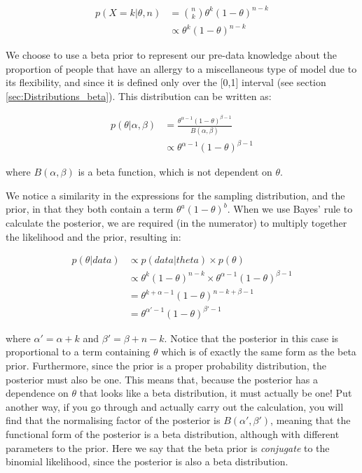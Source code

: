 \documentclass[11pt,fullpage]{book}
\begin{document}
\begin{align}
p(X=k|\theta,n) &= {n \choose k} \theta^k (1-\theta)^{n-k}\\
&\propto \theta^k (1-\theta)^{n-k}
\end{align}

We choose to use a beta prior to represent our pre-data knowledge about the proportion of people that have an allergy to a miscellaneous type of model due to its flexibility, and since it is defined only over the [0,1] interval (see section \ref{sec:Distributions_beta}). This distribution can be written as:

\begin{align}
p(\theta|\alpha,\beta) &= \frac{\theta^{\alpha-1}(1-\theta)^{\beta-1}}{B(\alpha,\beta)}\\
&\propto \theta^{\alpha-1}(1-\theta)^{\beta-1}
\end{align}

where $B(\alpha,\beta)$ is a beta function, which is not dependent on $\theta$.

We notice a similarity in the expressions for the sampling distribution, and the prior, in that they both contain a term $\theta^a (1-\theta)^b$. When we use Bayes' rule to calculate the posterior, we are required (in the numerator) to multiply together the likelihood and the prior, resulting in:

\begin{align}
p(\theta|data) &\propto p(data|theta) \times p(\theta)\\
&\propto \theta^k (1-\theta)^{n-k} \times \theta^{\alpha-1}(1-\theta)^{\beta-1}\\
&= \theta^{k+ \alpha - 1} (1-\theta)^{n-k + \beta - 1}\\
&= \theta^{\alpha' - 1}(1-\theta)^{\beta'-1}
\end{align}

where $\alpha'=\alpha + k$ and $\beta'= \beta + n - k$. Notice that the posterior in this case is proportional to a term containing $\theta$ which is of exactly the same form as the beta prior. Furthermore, since the prior is a proper probability distribution, the posterior must also be one. This means that, because the posterior has a dependence on $\theta$ that looks like a beta distribution, it must actually be one! Put another way, if you go through and actually carry out the calculation, you will find that the normalising factor of the posterior is $B(\alpha',\beta')$, meaning that the functional form of the posterior is a beta distribution, although with different parameters to the prior. Here we say that the beta prior is \textit{conjugate} to the binomial likelihood, since the posterior is also a beta distribution.
\end{document}
